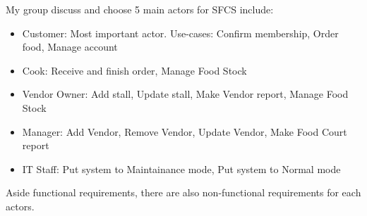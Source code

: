 My group discuss and choose 5 main actors for SFCS include:

\begin{itemize}
\item Customer: Most important actor. Use-cases: Confirm membership, Order food, Manage account
\item Cook: Receive and finish order, Manage Food Stock
\item Vendor Owner: Add stall, Update stall, Make Vendor report, Manage Food Stock
\item Manager: Add Vendor, Remove Vendor, Update Vendor, Make Food Court report 
\item IT Staff: Put system to Maintainance mode, Put system to Normal mode
\end{itemize}

Aside functional requirements, there are also non-functional requirements for each actors.
